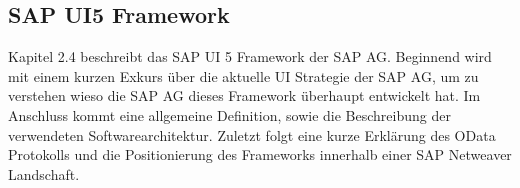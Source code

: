%
%    


\subsection{SAP UI5 Framework}
Kapitel 2.4 beschreibt das SAP UI 5 Framework der SAP AG. Beginnend wird mit einem kurzen Exkurs über die aktuelle UI Strategie der SAP AG, um zu verstehen wieso die SAP AG dieses Framework überhaupt entwickelt hat. Im Anschluss kommt eine allgemeine Definition, sowie die Beschreibung der verwendeten Softwarearchitektur. Zuletzt folgt eine kurze Erklärung des OData Protokolls und die Positionierung des Frameworks innerhalb einer SAP Netweaver Landschaft.

